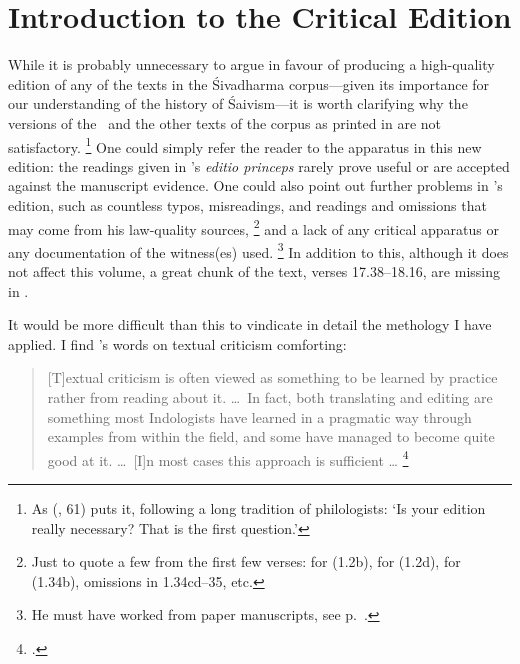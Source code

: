 \section{Introduction to the Critical Edition}

While it is probably unnecessary to argue in favour of
producing a high-quality edition of any of the texts in the Śivadharma
corpus---given its importance for our understanding
of the history of Śaivism---it is worth
clarifying why the versions of the \VSS\ and the other texts of the corpus
as printed in  are not satisfactory.%
		\footnote{As \citeauthor{WestTextual} (\citeyear{WestTextual}, 61) 
			puts it, following a long tradition of philologists:
						`Is your edition really necessary? That is the first question.'}
One could simply refer the reader to the apparatus in
this new edition: the readings given in \citeauthor{NaraharinathSivadharma}'s 
\emph{editio princeps} rarely prove useful or are 
accepted against the manuscript evidence.
One could also point out further problems in 
\citeauthor{NaraharinathSivadharma}'s edition, such
as countless typos, misreadings, and readings and omissions that 
may come from his law-quality sources,%
		\footnote{Just to quote a few from the first few verses:
								 for  (1.2b),
								 for  (1.2d),
								 for  (1.34b), omissions in 1.34cd--35, etc.}
and a lack of any critical apparatus or any documentation of the witness(es) used.%
		\footnote{He must have worked from paper manuscripts,
								see p.~\pageref{narahari_paperms}.}
In addition to this, although it does not affect this volume,
a great chunk of the text, verses 17.38--18.16, are 
missing in \citeauthor{NaraharinathSivadharma}.

It would be more difficult than this to vindicate in detail the methology
I have applied. I find \citeauthor{HannederIntro}'s 
words on textual criticism comforting:

\begin{quote}
[T]extual criticism is often viewed as something to be learned by practice rather from reading about it.
\dots\ In fact, both translating and editing are something most Indologists have learned in a pragmatic
way through examples from within the field, and some have managed to become quite good at it.
\dots\ [I]n most cases this approach is sufficient \dots%
		\footnote{.}
\end{quote}

